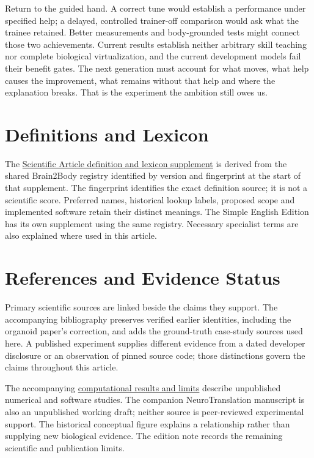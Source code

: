 Return to the guided hand. A correct tune would establish a performance under
specified help; a delayed, controlled trainer-off comparison would ask what the
trainee retained. Better measurements and body-grounded tests might connect
those two achievements. Current results establish neither arbitrary skill
teaching nor complete biological virtualization, and the current development
models fail their benefit gates. The next generation must account for what
moves, what help causes the improvement, what remains without that help and
where the explanation breaks. That is the experiment the ambition still owes
us.\par

\section{Definitions and Lexicon}

The \hyperref[programme-definitions]{Scientific Article definition and lexicon supplement} is derived from the shared Brain2Body registry identified by version and fingerprint at the start of that supplement. The fingerprint identifies the exact definition source; it is not a scientific score. Preferred names, historical lookup labels, proposed scope and implemented software retain their distinct meanings. The Simple English Edition has its own supplement using the same registry. Necessary specialist terms are also explained where used in this article.\par

\section{References and Evidence Status}

Primary scientific sources are linked beside the claims they support. The accompanying bibliography preserves verified earlier identities, including the organoid paper's correction, and adds the ground-truth case-study sources used here. A published experiment supplies different evidence from a dated developer disclosure or an observation of pinned source code; those distinctions govern the claims throughout this article.\par

The accompanying \href{research-evidence.json}{computational results and limits}
describe unpublished numerical and software studies. The companion
NeuroTranslation manuscript is also an unpublished working draft; neither
source is peer-reviewed experimental support. The historical conceptual figure
explains a relationship rather than supplying new biological evidence. The
edition note records the remaining scientific and publication limits.\par

